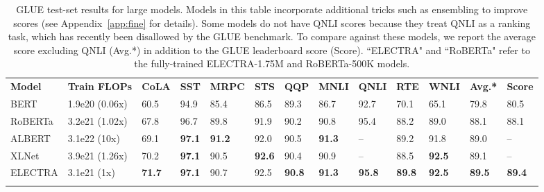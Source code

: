 \documentclass{article}
\newcommand\tstrut{\rule{0pt}{2.6ex}}
\newcommand\bstrut{\rule[-1.0ex]{0pt}{0pt}}
\newcommand{\thinline}{\Xhline{1.5\arrayrulewidth}}
\newcommand{\thickline}{\Xhline{2.5\arrayrulewidth}}
\newcommand{\tsep}	{\bstrut \\ \thinline}
\newcommand{\ttop}{\thickline}
\newcommand{\tbottom}{\bstrut \\ \thickline}
\begin{document}
\addtolength{\tabcolsep}{-3.5pt}
\begin{table*}[t!]
\small
\begin{center}
\begin{tabularx}{\linewidth}{X l l l l l l l l l l l l}
\ttop 
\textbf{Model} & \textbf{Train FLOPs} & \textbf{CoLA} & \textbf{SST} & \textbf{MRPC} & \textbf{STS} & \textbf{QQP} & \textbf{MNLI} & \textbf{QNLI} & \textbf{RTE} & \textbf{WNLI} & \textbf{Avg.*} & \textbf{Score} \tstrut \tsep 
BERT      &  1.9e20 (0.06x)   & 60.5 & 94.9 & 85.4 & 86.5 & 89.3 & 86.7 & 92.7 & 70.1 & 65.1 & 79.8 & 80.5 \tstrut \\
RoBERTa      &  3.2e21 (1.02x)   & 67.8 & 96.7 & 89.8 & 91.9 & 90.2 & 90.8 & 95.4 & 88.2 & 89.0 & 88.1 & 88.1 \\
ALBERT      &  3.1e22 (10x)  & 69.1 & \textbf{97.1} & \textbf{91.2} & 92.0 & 90.5 & \textbf{91.3} & -- & 89.2 & 91.8 & 89.0 & -- \\
XLNet      & 3.9e21 (1.26x)    & 70.2 & \textbf{97.1} & 90.5 & \textbf{92.6} & 90.4 & 90.9 & -- & 88.5 & \textbf{92.5} & 89.1 & -- \tsep
ELECTRA &  3.1e21 (1x) & \textbf{71.7} & \textbf{97.1} & 90.7 & 92.5 & \textbf{90.8} & \textbf{91.3} & \textbf{95.8} & \textbf{89.8} & \textbf{92.5} & \textbf{89.5} & \textbf{89.4} \tstrut \tbottom
\end{tabularx} 
\end{center}
\vspace{-1mm}
\caption{GLUE test-set results for large models. 
Models in this table incorporate additional tricks such as ensembling to improve scores (see Appendix~\ref{app:fine} for details).
Some models do not have QNLI scores because they treat QNLI as a ranking task, which has recently been disallowed by the GLUE benchmark. To compare against these models, we report the average score excluding QNLI (Avg.*) in addition to the GLUE leaderboard score (Score). 
``ELECTRA" and ``RoBERTa" refer to the fully-trained ELECTRA-1.75M and RoBERTa-500K models.
}
\label{tab:test}
\end{table*}
\addtolength{\tabcolsep}{3.5pt}
\vspace{-1mm}
\end{document}
